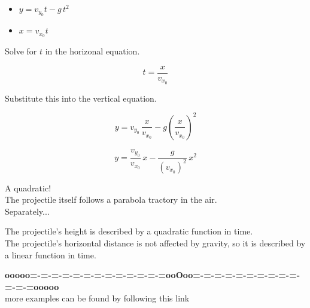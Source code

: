 \documentclass{ximera}
\begin{document}
\begin{itemize}
\item $y = v_{y_0} t - g \, t^2$


\item $x = v_{x_0} t$
\end{itemize}


Solve for $t$ in the horizonal equation.


\[ t = \frac{x}{v_{x_0}} \]

Substitute this into the vertical equation.


\[  y = v_{y_0} \, \frac{x}{v_{x_0}} - g \left(\frac{x}{v_{x_0}}\right)^2  \]



\[  y = \frac{v_{y_0}}{v_{x_0}} \, x  - \frac{g}{(v_{x_0})^2} \, x^2 \]



A quadratic! \\

The projectile itself follows a parabola tractory in the air. \\


Separately...


The projectile's height is described by a quadratic function in time. \\


The projectile's horizontal distance is not affected by gravity, so it is described by a linear function in time. \\












\begin{center}
\textbf{\textcolor{green!50!black}{ooooo=-=-=-=-=-=-=-=-=-=-=-=-=ooOoo=-=-=-=-=-=-=-=-=-=-=-=-=ooooo}} \\

more examples can be found by following this link\\ 

\end{center}
\end{document}
